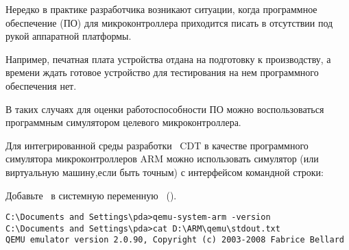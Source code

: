 \label{qemuinstall}

Нередко в практике разработчика возникают ситуации, когда программное обеспечение (ПО) для микроконтроллера
приходится писать в отсутствии под рукой аппаратной платформы.

Например, печатная плата устройства отдана на подготовку к производству, а времени ждать
готовое устройство для тестирования на нем программного обеспечения нет.

В таких случаях для оценки работоспособности ПО можно воспользоваться программным симулятором целевого микроконтроллера.

Для интегрированной среды разработки \eclipse\ CDT в качестве программного
симулятора микроконтроллеров ARM можно использовать симулятор (или виртуальную машину,если быть точным) 
 с интерфейсом командной строки:

\bigskip{}






\bigskip Добавьте \ в системную переменную
\ ().

\bigskip

\begin{lstlisting}[style=con]
C:\Documents and Settings\pda>qemu-system-arm -version
C:\Documents and Settings\pda>cat D:\ARM\qemu\stdout.txt
QEMU emulator version 2.0.90, Copyright (c) 2003-2008 Fabrice Bellard
\end{lstlisting}

